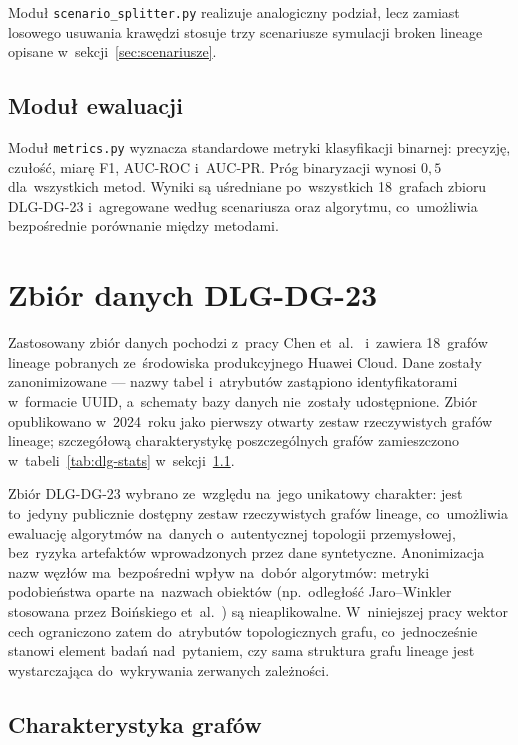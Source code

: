 Moduł \texttt{scenario\_splitter.py} realizuje analogiczny podział,
lecz zamiast losowego usuwania krawędzi stosuje trzy scenariusze
symulacji broken lineage opisane w~sekcji~\ref{sec:scenariusze}.

\subsection{Moduł ewaluacji}

Moduł \texttt{metrics.py} wyznacza standardowe metryki klasyfikacji
binarnej: precyzję, czułość, miarę F1, AUC-ROC i~AUC-PR. Próg
binaryzacji wynosi $0{,}5$ dla~wszystkich metod. Wyniki są
uśredniane po~wszystkich 18~grafach zbioru DLG-DG-23 i~agregowane
według scenariusza oraz algorytmu, co~umożliwia bezpośrednie
porównanie między metodami.

\section{Zbiór danych DLG-DG-23}
\label{sec:dane}

Zastosowany zbiór danych pochodzi z~pracy Chen et~al.~\cite{Chen2024}
i~zawiera 18~grafów lineage pobranych ze~środowiska produkcyjnego
Huawei Cloud. Dane zostały zanonimizowane — nazwy tabel i~atrybutów
zastąpiono identyfikatorami w~formacie UUID, a~schematy bazy danych
nie~zostały udostępnione. Zbiór opublikowano w~2024~roku jako pierwszy
otwarty zestaw rzeczywistych grafów lineage; szczegółową charakterystykę
poszczególnych grafów zamieszczono w~tabeli~\ref{tab:dlg-stats} w~sekcji~\ref{sec:dane-opis}.

Zbiór DLG-DG-23 wybrano ze~względu na~jego unikatowy charakter:
jest to~jedyny publicznie dostępny zestaw rzeczywistych grafów lineage,
co~umożliwia ewaluację algorytmów na~danych o~autentycznej topologii
przemysłowej, bez~ryzyka artefaktów wprowadzonych przez dane
syntetyczne. Anonimizacja nazw węzłów ma~bezpośredni wpływ na~dobór
algorytmów: metryki podobieństwa oparte na~nazwach obiektów
(np.~odległość Jaro--Winkler stosowana przez Boińskiego
et~al.~\cite{Boinski2025}) są nieaplikowalne. W~niniejszej pracy
wektor cech ograniczono zatem do~atrybutów topologicznych grafu,
co~jednocześnie stanowi element badań nad~pytaniem, czy sama struktura
grafu lineage jest wystarczająca do~wykrywania zerwanych zależności.

\subsection{Charakterystyka grafów}
\label{sec:dane-opis}

